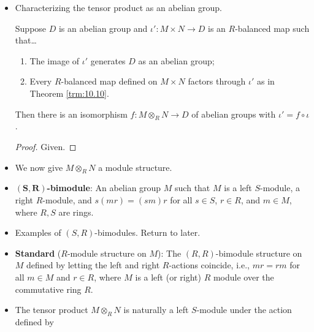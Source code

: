 \documentclass[../notes.tex]{subfiles}
\begin{document}
\begin{itemize}
\begin{theorem}
\begin{figure}[H]
            \caption{Universal property of the general tensor product.}
            \label{fig:univPropMotimesRN}
        \end{figure}
        establishes a bijection between the $R$-balanced maps $\varphi:M\times N\to L$ and the group homomorphisms $\Phi:M\otimes_RN\to L$.
        \begin{proof}
            Given.
        \end{proof}
    \end{theorem}
    \item Characterizing the tensor product as an abelian group.
    \begin{corollary}\label{cly:10.11}
        Suppose $D$ is an abelian group and $\iota':M\times N\to D$ is an $R$-balanced map such that\dots
        \begin{enumerate}[label={(\roman*)}]
            \item The image of $\iota'$ generates $D$ as an abelian group;
            \item Every $R$-balanced map defined on $M\times N$ factors through $\iota'$ as in Theorem \ref{trm:10.10}.
        \end{enumerate}
        Then there is an isomorphism $f:M\otimes_RN\to D$ of abelian groups with $\iota'=f\circ\iota$.
        \begin{proof}
            Given.
        \end{proof}
    \end{corollary}
    \item We now give $M\otimes_RN$ a module structure.
    \item \textbf{$\bm{(S,R)}$-bimodule}: An abelian group $M$ such that $M$ is a left $S$-module, a right $R$-module, and $s(mr)=(sm)r$ for all $s\in S$, $r\in R$, and $m\in M$, where $R,S$ are rings.
    \item Examples of $(S,R)$-bimodules. Return to later.
    \item \textbf{Standard} ($R$-module structure on $M$): The $(R,R)$-bimodule structure on $M$ defined by letting the left and right $R$-actions coincide, i.e., $mr=rm$ for all $m\in M$ and $r\in R$, where $M$ is a left (or right) $R$ module over the commutative ring $R$.
    \item The tensor product $M\otimes_RN$ is naturally a left $S$-module under the action defined by

\end{itemize}
\end{document}
